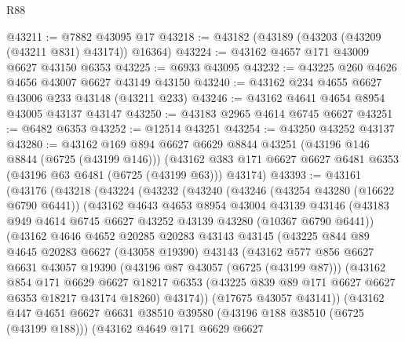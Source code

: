 \begin{lexlean}{R88}
\begin{coremodule}
@43211 := @7882 @43095 @17
@43218 := @43182 (@43189 (@43203 (@43209 (@43211 @831) @43174)) @16364)
@43224 := @43162 @4657 @171 @43009 @6627 @43150 @6353
@43225 := @6933 @43095
@43232 := @43225 @260 @4626 @4656 @43007 @6627 @43149 @43150
@43240 := @43162 @234 @4655 @6627 @43006 @233 @43148 (@43211 @233)
@43246 := @43162 @4641 @4654 @8954 @43005 @43137 @43147
@43250 := @43183 @2965 @4614 @6745 @6627
@43251 := @6482 @6353
@43252 := @12514 @43251
@43254 := @43250 @43252 @43137
@43280 := @43162
    @169
    @894
    @6627
    @6629
    @8844
    @43251
    (@43196 @146 @8844 (@6725 (@43199 @146)))
    (@43162 @383 @171 @6627 @6627 @6481 @6353 (@43196 @63 @6481 (@6725 (@43199 @63))) @43174)
@43393 := @43161
    (@43176
      (@43218
        (@43224
          (@43232
            (@43240
              (@43246
                (@43254 @43280 (@16622 @6790 @6441))
                (@43162
                  @4643
                  @4653
                  @8954
                  @43004
                  @43139
                  @43146
                  (@43183 @949 @4614 @6745 @6627 @43252 @43139 @43280 (@10367 @6790 @6441))
                  (@43162
                    @4646
                    @4652
                    @20285
                    @20283
                    @43143
                    @43145
                    (@43225
                      @844
                      @89
                      @4645
                      @20283
                      @6627
                      (@43058 @19390)
                      @43143
                      (@43162
                        @577
                        @856
                        @6627
                        @6631
                        @43057
                        @19390
                        (@43196 @87 @43057 (@6725 (@43199 @87)))
                        (@43162
                          @854
                          @171
                          @6629
                          @6627
                          @18217
                          @6353
                          (@43225 @839 @89 @171 @6627 @6627 @6353 @18217 @43174 @18260)
                          @43174))
                      (@17675 @43057 @43141))
                    (@43162
                      @447
                      @4651
                      @6627
                      @6631
                      @38510
                      @39580
                      (@43196 @188 @38510 (@6725 (@43199 @188)))
                      (@43162
                        @4649
                        @171
                        @6629
                        @6627

\end{coremodule}
\end{lexlean}
